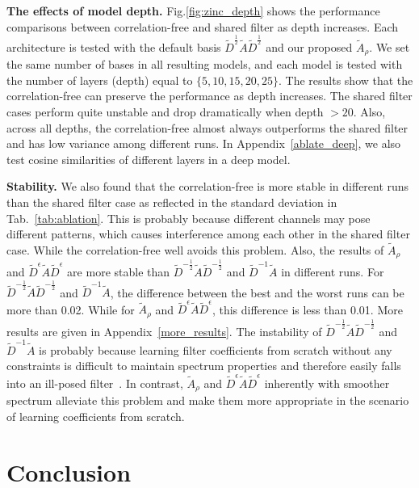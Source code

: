 \documentclass[nohyperref]{article}
\theoremstyle{plain}
\theoremstyle{definition}
\theoremstyle{remark}
\begin{document}
\textbf{The effects of model depth.}
Fig.\ref{fig:zinc_depth} shows the performance comparisons between correlation-free and shared filter as depth increases.
Each architecture is tested with the default basis $\tilde D^{\frac{1}{2}}\tilde A\tilde D^{\frac{1}{2}}$ and our proposed $\tilde A_{\rho}$.
We set the same number of bases in all resulting models, and each model is tested with the number of layers (depth) equal to $\{5, 10, 15, 20, 25\}$.
The results show that the correlation-free can preserve the performance as depth increases.
The shared filter cases perform quite unstable and drop dramatically when depth $>20$. Also, across all depths, the correlation-free almost always outperforms the shared filter and has low variance among different runs.
In Appendix~\ref{ablate_deep}, we also test cosine similarities of different layers in a deep model.

\textbf{Stability.}
We also found that the correlation-free is more stable in different runs than the shared filter case as reflected in the standard deviation in Tab.~\ref{tab:ablation}.
This is probably because different channels may pose different patterns, which causes interference among each other in the shared filter case. While the correlation-free well avoids this problem.
Also, the results of $\tilde A_{\rho}$ and $\tilde{D}^{\epsilon}\tilde{A}\tilde{D}^{\epsilon}$ are more stable than $\tilde{D}^{-\frac{1}{2}}\tilde{A}\tilde{D}^{-\frac{1}{2}}$ and $\tilde D^{-1}\tilde A$ in different runs.
For $\tilde{D}^{-\frac{1}{2}}\tilde{A}\tilde{D}^{-\frac{1}{2}}$ and $\tilde D^{-1}\tilde A$, the difference between the best and the worst runs can be more than 0.02.
While for $\tilde A_{\rho}$ and $\tilde{D}^{\epsilon}\tilde{A}\tilde{D}^{\epsilon}$, this difference is less than 0.01.
More results are given in Appendix~\ref{more_results}.
The instability of $\tilde{D}^{-\frac{1}{2}}\tilde{A}\tilde{D}^{-\frac{1}{2}}$ and $\tilde D^{-1}\tilde A$ is probably because learning filter coefficients from scratch without any constraints is difficult to maintain spectrum properties and therefore easily falls into an ill-posed filter~\cite{he2021bernnet}.
In contrast, $\tilde A_{\rho}$ and $\tilde{D}^{\epsilon}\tilde{A}\tilde{D}^{\epsilon}$ inherently with smoother spectrum alleviate this problem and make them more appropriate in the scenario of learning coefficients from scratch.


\section{Conclusion}
\end{document}

